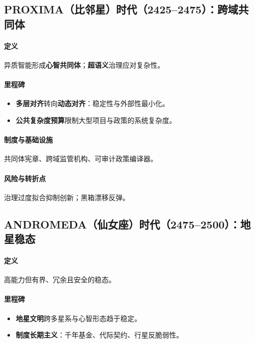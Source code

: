\documentclass[11pt]{article}
\begin{document}
\subsection{PROXIMA（比邻星）时代（2425–2475）：跨域共同体}
\paragraph{定义} 异质智能形成\textbf{心智共同体}；\textbf{超语义}治理应对复杂性。

\paragraph{里程碑}
\begin{itemize}[noitemsep]
  \item \textbf{多层对齐}转向\textbf{动态对齐}：稳定性与外部性最小化。
  \item \textbf{公共复杂度预算}限制大型项目与政策的系统复杂度。
\end{itemize}

\paragraph{制度与基础设施} 共同体宪章、跨域监管机构、可审计政策编译器。

\paragraph{风险与转折点} 治理过度拟合抑制创新；黑箱漂移反弹。

\subsection{ANDROMEDA（仙女座）时代（2475–2500）：地星稳态}
\paragraph{定义} 高能力但有界、冗余且安全的稳态。

\paragraph{里程碑}
\begin{itemize}[noitemsep]
  \item \textbf{地星文明}跨多星系与心智形态趋于稳定。
  \item \textbf{制度长期主义}：千年基金、代际契约、行星反脆弱性。
\end{itemize}
\end{document}
